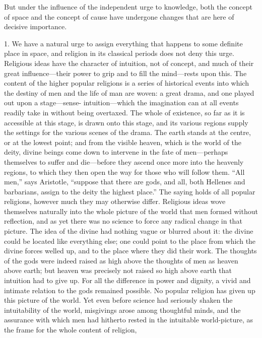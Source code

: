 \documentclass[12pt,a4paper]{article}
\newcommand{\opage}[1]{\marginnote{\footnotesize\textit{[#1]}}}
\begin{document}
But under the influence of the independent urge to knowledge, both the
concept of space and the concept of cause have undergone changes that are
here of decisive importance.

\medskip

1. We have a natural urge to assign everything that happens to some definite
place in space, and religion in its classical periods does not deny this
urge. Religious ideas have the character of intuition, not of concept, and
much of their great influence---their power to grip and to fill the
mind---rests upon this. The content of the higher popular religions is a
series of historical events into which the destiny of men and the life of
man are woven: a great drama, and one played out upon a stage---sense-
intuition---which the imagination can at all events readily take in without
being overtaxed. The whole of existence, so far as it is accessible at this
stage, is drawn onto this stage, and its various regions supply the settings
for the various scenes of the drama. The earth stands at the centre, or at
the lowest point; and from the visible heaven, which is the world of the
deity, divine beings come down to intervene in the fate of men---perhaps
themselves to suffer and die---before they ascend once more into the heavenly
regions, to which they then open the way for those who will follow them.
``All men,'' says Aristotle, ``suppose that there are gods, and all, both
Hellenes and barbarians, assign to the deity the highest place.'' The saying
holds of all popular religions, however much they may otherwise differ.
Religious ideas wove themselves naturally into the whole picture of the world
that men formed without reflection, and as yet \opage{5}there was no science to force
any radical change in that picture. The idea of the divine had nothing vague
or blurred about it: the divine could be located like everything else; one
could point to the place from which the divine forces welled up, and to the
place where they did their work. The thoughts of the gods were indeed raised
as high above the thoughts of men as heaven above earth; but heaven was
precisely not raised so high above earth that intuition had to give up. For
all the difference in power and dignity, a vivid and intimate relation to the
gods remained possible.
No popular religion has given up this picture of the world. Yet even before
science had seriously shaken the intuitability of the world, misgivings arose
among thoughtful minds, and the assurance with which men had hitherto rested in
the intuitable world-picture, as the frame for the whole content of religion,
\end{document}
